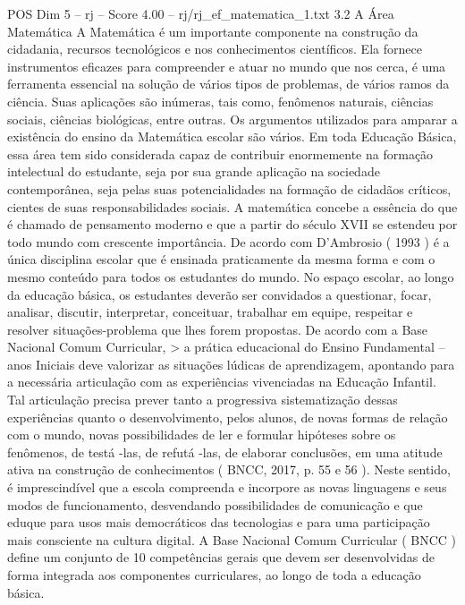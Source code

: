 \begin{textsample}{POS Dim 5 – rj – Score 4.00 – rj/rj\_ef\_matematica\_1.txt}  \label{ex:f5_pos_194}
3.2 A Área Matemática A Matemática é um importante componente na construção da cidadania, recursos tecnológicos e nos conhecimentos científicos.
Ela fornece instrumentos eficazes para compreender e atuar no mundo que nos cerca, é uma ferramenta essencial na solução de vários tipos de problemas, de vários ramos da ciência.
Suas aplicações são inúmeras, tais como, fenômenos naturais, ciências sociais, ciências biológicas, entre outras.
Os argumentos utilizados para amparar a existência do ensino da Matemática escolar são vários.
Em toda Educação Básica, essa área tem sido considerada capaz de contribuir enormemente na formação intelectual do estudante, seja por sua grande aplicação na sociedade contemporânea, seja pelas suas potencialidades na formação de cidadãos críticos, cientes de suas responsabilidades sociais.
A matemática concebe a essência do que é chamado de pensamento moderno e que a partir do século XVII se estendeu por todo mundo com crescente importância.
De acordo com D’Ambrosio ( 1993 ) é a única disciplina escolar que é ensinada praticamente da mesma forma e com o mesmo conteúdo para todos os estudantes do mundo.
No espaço escolar, ao longo da educação básica, os estudantes deverão ser convidados a questionar, focar, analisar, discutir, interpretar, conceituar, trabalhar em equipe, respeitar e resolver situações-problema que lhes forem propostas.
De acordo com a Base Nacional Comum Curricular, > a prática educacional do Ensino Fundamental – anos Iniciais deve valorizar as situações lúdicas de aprendizagem, apontando para a necessária articulação com as experiências vivenciadas na Educação Infantil.
Tal articulação precisa prever tanto a progressiva sistematização dessas experiências quanto o desenvolvimento, pelos alunos, de novas formas de relação com o mundo, novas possibilidades de ler e formular hipóteses sobre os fenômenos, de testá -las, de refutá -las, de elaborar conclusões, em uma atitude ativa na construção de conhecimentos ( BNCC, 2017, p. 55 e 56 ).
Neste sentido, é imprescindível que a escola compreenda e incorpore as novas linguagens e seus modos de funcionamento, desvendando possibilidades de comunicação e que eduque para usos mais democráticos das tecnologias e para uma participação mais consciente na cultura digital.
A Base Nacional Comum Curricular ( BNCC ) define um conjunto de 10 competências gerais que devem ser desenvolvidas de forma integrada aos componentes curriculares, ao longo de toda a educação básica.

\end{textsample}
